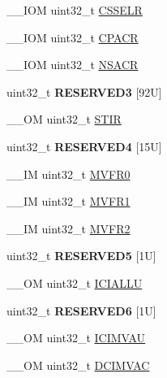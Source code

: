 \begin{DoxyCompactItemize}
\+\_\+\+\_\+\+I\+OM uint32\+\_\+t \mbox{\hyperlink{struct_s_c_b___type_ad3884e8b6504ec63c1eaa8742e94df3d}{C\+S\+S\+E\+LR}}
\item 
\+\_\+\+\_\+\+I\+OM uint32\+\_\+t \mbox{\hyperlink{struct_s_c_b___type_ac6a860c1b8d8154a1f00d99d23b67764}{C\+P\+A\+CR}}
\item 
\+\_\+\+\_\+\+I\+OM uint32\+\_\+t \mbox{\hyperlink{struct_s_c_b___type_a525790dfb9d9e3dd8eb126cdfebcd472}{N\+S\+A\+CR}}
\item 
\mbox{\label{struct_s_c_b___type_aea707bb951ff0fade7716ae63d809c67}} 
uint32\+\_\+t {\bfseries R\+E\+S\+E\+R\+V\+E\+D3} \mbox{[}92\+U\mbox{]}
\item 
\+\_\+\+\_\+\+OM uint32\+\_\+t \mbox{\hyperlink{struct_s_c_b___type_ad70825dd0869b7ccd07fb2b8680fcdb6}{S\+T\+IR}}
\item 
\mbox{\label{struct_s_c_b___type_a1c0f2702e0987ca2370a9771b6df3475}} 
uint32\+\_\+t {\bfseries R\+E\+S\+E\+R\+V\+E\+D4} \mbox{[}15\+U\mbox{]}
\item 
\+\_\+\+\_\+\+IM uint32\+\_\+t \mbox{\hyperlink{struct_s_c_b___type_a7a1ba0f875c0e97c1673882b1106e66b}{M\+V\+F\+R0}}
\item 
\+\_\+\+\_\+\+IM uint32\+\_\+t \mbox{\hyperlink{struct_s_c_b___type_a75d6299150fdcbbcb765e22ff27c432e}{M\+V\+F\+R1}}
\item 
\+\_\+\+\_\+\+IM uint32\+\_\+t \mbox{\hyperlink{struct_s_c_b___type_a280ef961518ecee3ed43a86404853c3d}{M\+V\+F\+R2}}
\item 
\mbox{\label{struct_s_c_b___type_af3d8e275bd4c96416cf9cd7464bb7d7c}} 
uint32\+\_\+t {\bfseries R\+E\+S\+E\+R\+V\+E\+D5} \mbox{[}1\+U\mbox{]}
\item 
\+\_\+\+\_\+\+OM uint32\+\_\+t \mbox{\hyperlink{struct_s_c_b___type_a573260e7836dbc43707df97dd475a0c8}{I\+C\+I\+A\+L\+LU}}
\item 
\mbox{\label{struct_s_c_b___type_a1181e38c1923bf8f5d039f3441bbcaac}} 
uint32\+\_\+t {\bfseries R\+E\+S\+E\+R\+V\+E\+D6} \mbox{[}1\+U\mbox{]}
\item 
\+\_\+\+\_\+\+OM uint32\+\_\+t \mbox{\hyperlink{struct_s_c_b___type_a5eca5a3e5aedd89a9655df8f5798e2b0}{I\+C\+I\+M\+V\+AU}}
\item 
\+\_\+\+\_\+\+OM uint32\+\_\+t \mbox{\hyperlink{struct_s_c_b___type_a4be79491ab1ed14f3b0237ba7e69063c}{D\+C\+I\+M\+V\+AC}}

\end{DoxyCompactItemize}
